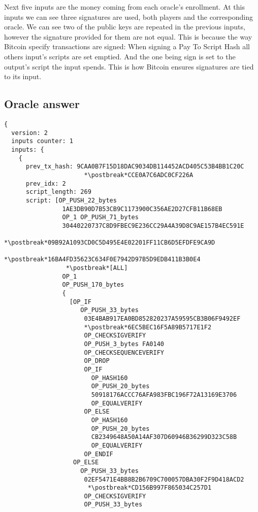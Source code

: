 Next five inputs are the money coming from each oracle's enrollment.
At this inputs we can see three signatures are used, both players and the
  corresponding oracle.
We can see two of the public keys are repeated in the previous inputs, however
  the signature provided for them are not equal.
This is because the way Bitcoin specify transactions are signed: When signing a
  Pay To Script Hash all others input's scripts are set emptied.
And the one being sign is set to the output's script the input spends.
This is how Bitcoin ensures signatures are tied to its input.

\subsection{Oracle answer}

\begin{lstlisting}
{
  version: 2
  inputs counter: 1
  inputs: {
    {
      prev_tx_hash: 9CAA0B7F15D18DAC9034DB114452ACD405C53B4BB1C20C
                      *\postbreak*CCE0A7C6ADC0CF226A
      prev_idx: 2
      script_length: 269
      script: [OP_PUSH_22_bytes
                1AE3DB90D7B53CB9C1173900C356AE2D27CFB11B68EB
                OP_1 OP_PUSH_71_bytes
                30440220737C8D9FBEC9E236CC29A4A39D8C9AE157B4EC591E
                 *\postbreak*09B92A1093CD0C5D495E4E02201FF11CB6D5EFDFE9CA9D
                 *\postbreak*16BA4FD35623C634F0E7942D97B5D9EDB411B3B0E4
                 *\postbreak*[ALL]
                OP_1
                OP_PUSH_170_bytes
                {
                  [OP_IF
                     OP_PUSH_33_bytes
                      03E4BAB917EA0BD852820237A59595CB3B06F9492EF
                      *\postbreak*6EC5BEC16F5A89B5717E1F2
                      OP_CHECKSIGVERIFY
                      OP_PUSH_3_bytes FA0140
                      OP_CHECKSEQUENCEVERIFY
                      OP_DROP
                      OP_IF
                        OP_HASH160
                        OP_PUSH_20_bytes
                        50918176ACCC76AFA983FBC196F72A13169E3706
                        OP_EQUALVERIFY
                      OP_ELSE
                        OP_HASH160
                        OP_PUSH_20_bytes
                        CB2349648A50A14AF307D60946B36299D323C58B
                        OP_EQUALVERIFY
                      OP_ENDIF
                   OP_ELSE
                     OP_PUSH_33_bytes
                      02EF5471E4BB8B2B6709C700057DBA30F2F9D418ACD2
                       *\postbreak*CD156B997F865034C257D1
                      OP_CHECKSIGVERIFY
                      OP_PUSH_33_bytes

\end{lstlisting}
